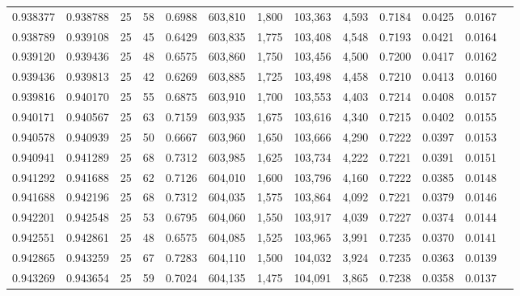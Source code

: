 \begin{tabular}{rrrrrrrrrrrrr}
0.938377 & 0.938788 &    25 &  58 &                                     0.6988 & 603,810 &   1,800 & 103,363 &   4,593 & 0.7184 & 0.0425 & 0.0167 \\
0.938789 & 0.939108 &    25 &  45 &                                     0.6429 & 603,835 &   1,775 & 103,408 &   4,548 & 0.7193 & 0.0421 & 0.0164 \\
0.939120 & 0.939436 &    25 &  48 &                                     0.6575 & 603,860 &   1,750 & 103,456 &   4,500 & 0.7200 & 0.0417 & 0.0162 \\
0.939436 & 0.939813 &    25 &  42 &                                     0.6269 & 603,885 &   1,725 & 103,498 &   4,458 & 0.7210 & 0.0413 & 0.0160 \\
0.939816 & 0.940170 &    25 &  55 &                                     0.6875 & 603,910 &   1,700 & 103,553 &   4,403 & 0.7214 & 0.0408 & 0.0157 \\
0.940171 & 0.940567 &    25 &  63 &                                     0.7159 & 603,935 &   1,675 & 103,616 &   4,340 & 0.7215 & 0.0402 & 0.0155 \\
0.940578 & 0.940939 &    25 &  50 &                                     0.6667 & 603,960 &   1,650 & 103,666 &   4,290 & 0.7222 & 0.0397 & 0.0153 \\
0.940941 & 0.941289 &    25 &  68 &                                     0.7312 & 603,985 &   1,625 & 103,734 &   4,222 & 0.7221 & 0.0391 & 0.0151 \\
0.941292 & 0.941688 &    25 &  62 &                                     0.7126 & 604,010 &   1,600 & 103,796 &   4,160 & 0.7222 & 0.0385 & 0.0148 \\
0.941688 & 0.942196 &    25 &  68 &                                     0.7312 & 604,035 &   1,575 & 103,864 &   4,092 & 0.7221 & 0.0379 & 0.0146 \\
0.942201 & 0.942548 &    25 &  53 &                                     0.6795 & 604,060 &   1,550 & 103,917 &   4,039 & 0.7227 & 0.0374 & 0.0144 \\
0.942551 & 0.942861 &    25 &  48 &                                     0.6575 & 604,085 &   1,525 & 103,965 &   3,991 & 0.7235 & 0.0370 & 0.0141 \\
0.942865 & 0.943259 &    25 &  67 &                                     0.7283 & 604,110 &   1,500 & 104,032 &   3,924 & 0.7235 & 0.0363 & 0.0139 \\
0.943269 & 0.943654 &    25 &  59 &                                     0.7024 & 604,135 &   1,475 & 104,091 &   3,865 & 0.7238 & 0.0358 & 0.0137 \\

\end{tabular}

